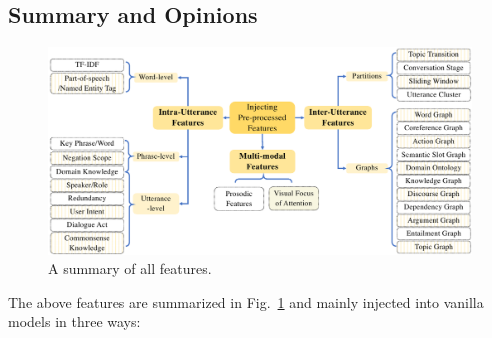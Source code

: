\subsection{Summary and Opinions}

\begin{figure}
	\centering
	\includegraphics[scale=0.65]{fig/approach-feature.pdf}
	\caption{A summary of all features.}
	\label{fig:app-feature}
\end{figure}
The above features are summarized in 
Fig.~\ref{fig:app-feature} and mainly {injected into vanilla models} 
in three ways: 

